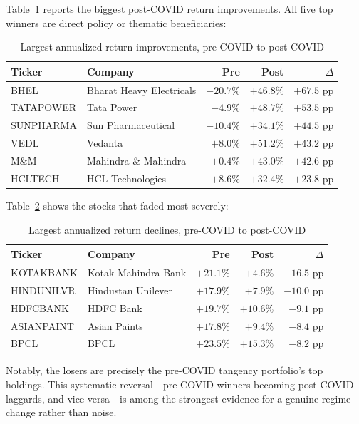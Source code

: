 \documentclass[12pt,a4paper]{article}
\begin{document}
Table~\ref{tab:winners} reports the biggest post-COVID return improvements. All five
top winners are direct policy or thematic beneficiaries:

\begin{table}[h]
\centering
\caption{Largest annualized return improvements, pre-COVID to post-COVID}
\label{tab:winners}
\begin{tabular}{llrrr}
\toprule
Ticker & Company & Pre & Post & $\Delta$ \\
\midrule
BHEL       & Bharat Heavy Electricals & $-20.7\%$ & $+46.8\%$ & $+67.5$ pp \\
TATAPOWER  & Tata Power               & $ -4.9\%$ & $+48.7\%$ & $+53.5$ pp \\
SUNPHARMA  & Sun Pharmaceutical       & $-10.4\%$ & $+34.1\%$ & $+44.5$ pp \\
VEDL       & Vedanta                  & $ +8.0\%$ & $+51.2\%$ & $+43.2$ pp \\
M\&M       & Mahindra \& Mahindra     & $ +0.4\%$ & $+43.0\%$ & $+42.6$ pp \\
HCLTECH    & HCL Technologies         & $ +8.6\%$ & $+32.4\%$ & $+23.8$ pp \\
\bottomrule
\end{tabular}
\end{table}

Table~\ref{tab:losers} shows the stocks that faded most severely:

\begin{table}[h]
\centering
\caption{Largest annualized return declines, pre-COVID to post-COVID}
\label{tab:losers}
\begin{tabular}{llrrr}
\toprule
Ticker & Company & Pre & Post & $\Delta$ \\
\midrule
KOTAKBANK  & Kotak Mahindra Bank  & $+21.1\%$ & $ +4.6\%$ & $-16.5$ pp \\
HINDUNILVR & Hindustan Unilever   & $+17.9\%$ & $ +7.9\%$ & $-10.0$ pp \\
HDFCBANK   & HDFC Bank            & $+19.7\%$ & $+10.6\%$ & $-9.1$ pp \\
ASIANPAINT & Asian Paints         & $+17.8\%$ & $ +9.4\%$ & $-8.4$ pp \\
BPCL       & BPCL                 & $+23.5\%$ & $+15.3\%$ & $-8.2$ pp \\
\bottomrule
\end{tabular}
\end{table}

Notably, the losers are precisely the pre-COVID tangency portfolio's top holdings. This
systematic reversal---pre-COVID winners becoming post-COVID laggards, and vice versa---is
among the strongest evidence for a genuine regime change rather than noise.
\end{document}
